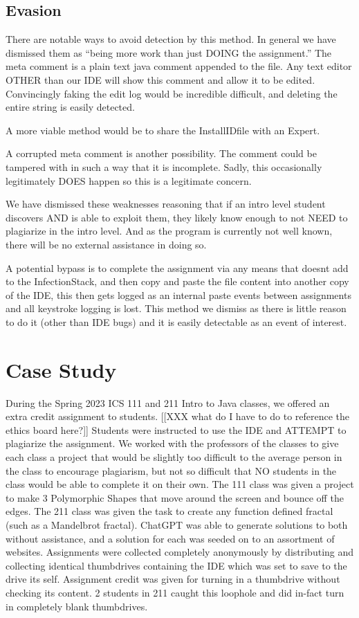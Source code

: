 \documentclass[conference]{IEEEtran}
\newcommand{\n}{\hfill\break}
\newcommand{\installID}{InstallID}
\newcommand{\infectionStack}{InfectionStack}
\begin{document}
\subsection*{\textbf{Evasion}}
There are notable ways to avoid detection by this method.  In general we have dismissed them as ``being more work than just DOING the assignment.''  The meta comment is a plain text java comment appended to the file.  Any text editor OTHER than our IDE will show this comment and allow it to be edited.  Convincingly faking the edit log would be incredible difficult, and deleting the entire string is easily detected.

A more viable method would be to share the \installID file with an Expert.


A corrupted meta comment is another possibility.  The comment could be tampered with in such a way that it is incomplete.  Sadly, this occasionally legitimately DOES happen so this is a legitimate concern.

We have dismissed these weaknesses reasoning that if an intro level student discovers AND is able to exploit them, they likely know enough to not NEED to plagiarize in the intro level.  And as the program is currently not well known, there will be no external assistance in doing so.

A potential bypass is to complete the assignment via any means that doesnt add to the \infectionStack, and then copy and paste the file content into another copy of the IDE, this then gets logged as an internal paste events between assignments and all keystroke logging is lost.  This method we dismiss as there is little reason to do it (other than IDE bugs) and it is easily detectable as an event of interest.

\n\section*{\textbf{Case Study}}
During the Spring 2023 ICS 111 and 211 Intro to Java classes, we offered an extra credit assignment to students. [[XXX what do I have to do to reference the ethics board here?]]
Students were instructed to use the IDE and ATTEMPT to plagiarize the assignment.  We worked with the professors of the classes to give each class a project that would be slightly too difficult to the average person in the class to encourage plagiarism, but not so difficult that NO students in the class would be able to complete it on their own.  The 111 class was given a project to make 3 Polymorphic Shapes that move around the screen and bounce off the edges.  The 211 class was given the task to create any function defined fractal (such as a Mandelbrot fractal).  ChatGPT was able to generate solutions to both without assistance, and a solution for each was seeded on to an assortment of websites.  Assignments were collected completely anonymously by distributing and collecting identical thumbdrives containing the IDE which was set to save to the drive its self.  Assignment credit was given for turning in a thumbdrive without checking its content.  2 students in 211 caught this loophole and did in-fact turn in completely blank thumbdrives.
\end{document}
